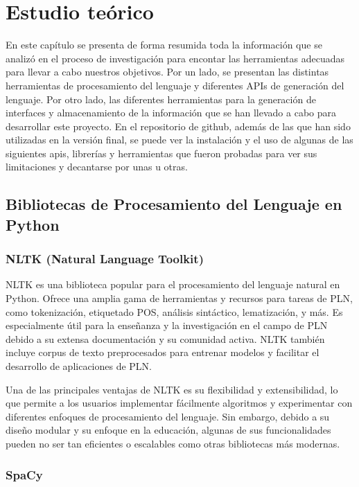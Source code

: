 \chapter{Estudio teórico}
\label{cap:Estudio teórico}
En este capítulo se presenta de forma resumida toda la información que se analizó en el proceso de investigación para encontar las herramientas adecuadas para llevar a cabo nuestros objetivos. Por un lado, se presentan las distintas herramientas de procesamiento del lenguaje y diferentes APIs de generación del lenguaje. Por otro lado, las diferentes herramientas para la generación de interfaces y almacenamiento de la información que se han llevado a cabo para desarrollar este proyecto. En el repositorio de github, además de las que han sido utilizadas en la versión final, se puede ver la instalación y el uso de algunas de las siguientes apis, librerías y herramientas que fueron probadas para ver sus limitaciones y decantarse por unas u otras. 
\section{Bibliotecas de Procesamiento del Lenguaje en Python}
\subsection{NLTK (Natural Language Toolkit)}

NLTK es una biblioteca popular para el procesamiento del lenguaje natural en Python. Ofrece una amplia gama de herramientas y recursos para tareas de PLN, como tokenización, etiquetado POS, análisis sintáctico, lematización, y más. Es especialmente útil para la enseñanza y la investigación en el campo de PLN debido a su extensa documentación y su comunidad activa. NLTK también incluye corpus de texto preprocesados para entrenar modelos y facilitar el desarrollo de aplicaciones de PLN.

Una de las principales ventajas de NLTK es su flexibilidad y extensibilidad, lo que permite a los usuarios implementar fácilmente algoritmos y experimentar con diferentes enfoques de procesamiento del lenguaje. Sin embargo, debido a su diseño modular y su enfoque en la educación, algunas de sus funcionalidades pueden no ser tan eficientes o escalables como otras bibliotecas más modernas.

\subsection{SpaCy}

